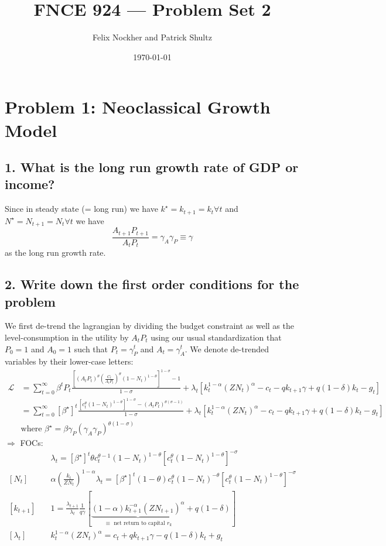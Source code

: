\documentclass[10pt,letter]{article}
\begin{document}
\title{FNCE 924 --- Problem Set 2}
\author{Felix Nockher and Patrick Shultz}
\date{\today}
\maketitle 

\section*{Problem 1: Neoclassical Growth Model}

\subsection*{1. What is the long run growth rate of GDP or income?}

Since in steady state (= long run) we have $k^\star = k_{t+1} = k_{t} \forall t$ and $N^\star = N_{t+1} = N_{t} \forall t$ we have $$\frac{A_{t+1}P_{t+1}}{A_{t}P_{t}}=\gamma_A\gamma_P \equiv \gamma$$ as the long run growth rate.

\subsection*{2. Write down the first order conditions for the problem}
We first de-trend the lagrangian by dividing the budget constraint as well as the level-consumption in the utility by $A_t P_t$ using our usual standardization that $P_0 = 1$ and $A_0 = 1$ such that $P_t = \gamma_P^t$ and $A_t = \gamma_A^t$. We denote de-trended variables by their lower-case letters:
\begin{align*}
\mathcal{L} & = \sum^\infty_{t=0} \beta^t P_t \frac{\left[(A_t P_t)^\theta \left( \frac{C_t}{A_t P_t} \right)^\theta (1 - N_t)^{1-\theta} \right]^{1-\sigma}-1}{1-\sigma} +\lambda_t \left[ k_t^{1 - \alpha} (ZN_t)^\alpha -c_t -qk_{t+1}\gamma + q (1-\delta) k_t - g_t\right]\\
 &=\sum^\infty_{t=0} [\beta^\star]^t \frac{\left[ c_t^\theta (1 - N_t)^{1-\theta} \right]^{1-\sigma}-(A_t P_t)^{\theta (\sigma - 1)}}{1-\sigma} +\lambda_t \left[ k_t^{1 - \alpha} (ZN_t)^\alpha -c_t -qk_{t+1}\gamma + q (1-\delta) k_t - g_t\right]\\
 & \text{where } \beta^\star = \beta \gamma_P (\gamma_A \gamma_P)^{\theta(1 - \sigma)}
\end{align*}
$\Rightarrow$ FOCs:
\begin{align*}
[c_t]&\quad \lambda_t = [\beta^\star]^t \theta c_t^{\theta -1 } (1 - N_t)^{1 - \theta}  [c_t^\theta (1-N_t)^{1-\theta}]^{- \sigma}\\
[N_t]&\quad \alpha \left( \frac{k_t}{ZN_t}\right)^{1-\alpha} \lambda_t = [\beta^\star]^t (1-\theta)c_t^\theta(1-N_t)^{-\theta}  [c_t^\theta (1-N_t)^{1-\theta}]^{- \sigma}\\
[k_{t+1}]&\quad 1 = \frac{\lambda_{t+1}}{\lambda_t}\frac{1}{q\gamma}[\underbrace{(1-\alpha) k_{t+1}^{-\alpha}(ZN_{t+1})^\alpha}_{\equiv \text{ net return to capital $r_k$}} + q ( 1 - \delta )]\\
[\lambda_{t}]&\quad k_t^{1 - \alpha} (ZN_t)^\alpha = c_t + qk_{t+1}\gamma - q (1-\delta) k_t + g_t
\end{align*}
\end{document}
